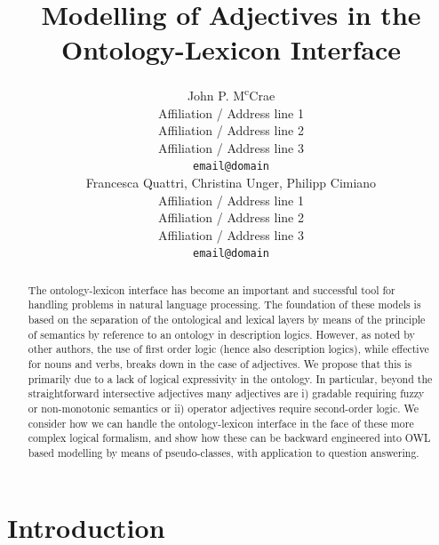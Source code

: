 \documentclass[11pt]{article}
\title{Modelling of Adjectives in the Ontology-Lexicon Interface}
\author{John P. M\textsuperscript{c}Crae \\
  Affiliation / Address line 1 \\
  Affiliation / Address line 2 \\
  Affiliation / Address line 3 \\
  {\tt email@domain} \\\And
  Francesca Quattri, Christina Unger, Philipp Cimiano \\
  Affiliation / Address line 1 \\
  Affiliation / Address line 2 \\
  Affiliation / Address line 3 \\
  {\tt email@domain} \\}
\date{}
\begin{document}
\maketitle
\begin{abstract}
    The ontology-lexicon interface has become an important and successful tool 
for handling problems in natural language processing. The foundation of these models 
is based on the separation of the ontological and lexical layers by means of the 
principle of semantics by reference to an ontology in description logics. 
However, as noted by other authors, the use of first order logic (hence also description logics),
while effective for nouns and verbs, breaks down in the case of adjectives. 
We propose that this is primarily due to a lack of logical expressivity in the 
ontology. In particular, beyond the straightforward intersective adjectives
many adjectives are i) gradable requiring fuzzy or 
non-monotonic semantics or ii) operator adjectives require second-order logic. 
We consider how we can handle the ontology-lexicon interface in the face of 
these more complex logical formalism, and show how these can be backward 
engineered into OWL based modelling by means of pseudo-classes, with application
to question answering.
\end{abstract}



\section{Introduction}
\label{intro}
\end{document}
